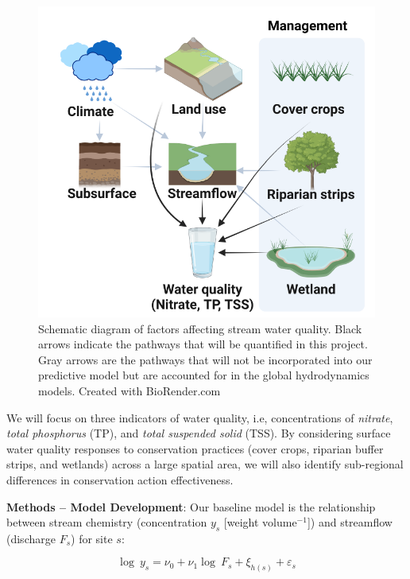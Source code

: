 \documentclass[12pt, class=article, crop=false]{standalone}
\begin{document}
\begin{figure}
    \includegraphics[scale=0.5]{output/fig_wq.pdf}
    \caption{Schematic diagram of factors affecting stream water quality. Black arrows indicate the pathways that will be quantified in this project. Gray arrows are the pathways that will not be incorporated into our predictive model but are accounted for in the global hydrodynamics models. Created with BioRender.com}
    \label{fig:wq}
\end{figure}

We will focus on three indicators of water quality, i.e, concentrations of \textit{nitrate}, \textit{total phosphorus} (TP), and \textit{total suspended solid} (TSS).
By considering surface water quality responses to conservation practices (cover crops, riparian buffer strips, and wetlands) across a large spatial area, we will also identify sub-regional differences in conservation action effectiveness.

\textbf{Methods -- Model Development}: Our baseline model is the relationship between stream chemistry (concentration $y_s$ [weight volume$^{-1}$]) and streamflow (discharge $F_s$) for site $s$:

\begin{equation}\label{eq:wq}
\log~y_s = \nu_0 + \nu_1 \log~F_s + \xi_{h(s)} + \varepsilon_s 
\end{equation}
\end{document}
